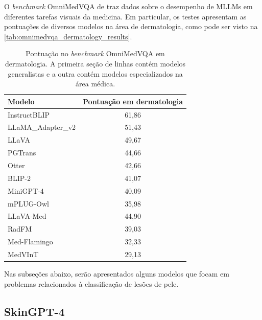 O \textit{benchmark} OmniMedVQA de \textcite{hu2024omnimedvqa} traz dados sobre o desempenho de \acp{MLLM} em
diferentes tarefas visuais da medicina. Em particular, os testes apresentam as pontuações de diversos modelos na área
de dermatologia, como pode ser visto na \autoref{tab:omnimedvqa_dermatology_results}.

\begin{table}[ht]
    \caption{\small Pontuação no \textit{benchmark} OmniMedVQA em dermatologia. A primeira seção de linhas contém modelos generalistas e a outra contém modelos
    especializados na área médica.}
    \centering
    \begin{tabular}{l|c}
        \hline
        Modelo                  & Pontuação em dermatologia \\ \hline
        InstructBLIP            & 61,86                     \\
        \ac{LLaMA}\_Adapter\_v2 & 51,43                     \\
        \ac{LLaVA}              & 49,67                     \\
        PGTrans                 & 44,66                     \\
        Otter                   & 42,66                     \\
        BLIP-2                  & 41,07                     \\
        Mini\ac{GPT}-4          & 40,09                     \\
        mPLUG-Owl               & 35,98                     \\ \hline
        \ac{LLaVA}-Med          & 44,90                     \\
        RadFM                   & 39,03                     \\
        Med-Flamingo            & 32,33                     \\
        MedVInT                 & 29,13                     \\ \hline
    \end{tabular}
    \label{tab:omnimedvqa_dermatology_results}
\end{table}

Nas subseções abaixo, serão apresentados alguns modelos que focam em problemas relacionados à classificação de lesões
de pele.

\subsection{SkinGPT-4}

